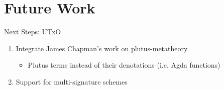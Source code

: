 \documentclass[aspectratio=43]{beamer}
\renewcommand\alert[1]{\textcolor{mLightBrown}{#1}}
\begin{document}
\section{Future Work}

\begin{frame}{Next Steps: UTxO}
\begin{enumerate}
\item Integrate James Chapman's work on \alert{plutus-metatheory}
  \begin{itemize}
  \item Plutus terms instead of their denotations (i.e. Agda functions)
  \end{itemize}
\item Support for \alert{multi-signature} schemes
\end{enumerate}
\end{frame}

\end{document}
